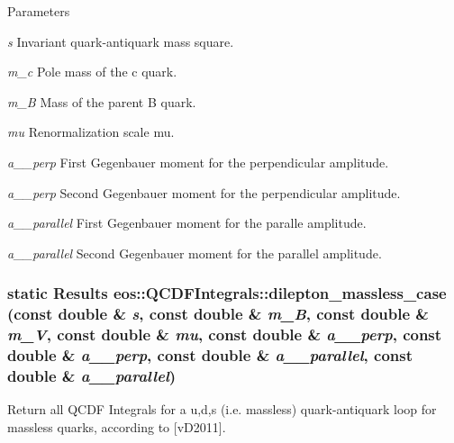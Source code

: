 \begin{DoxyParams}{Parameters}
\item[{\em s}]Invariant quark-\/antiquark mass square. \item[{\em m\_\-c}]Pole mass of the c quark. \item[{\em m\_\-B}]Mass of the parent B quark. \item[{\em mu}]Renormalization scale mu. \item[{\em a\_\-1\_\-perp}]First Gegenbauer moment for the perpendicular amplitude. \item[{\em a\_\-2\_\-perp}]Second Gegenbauer moment for the perpendicular amplitude. \item[{\em a\_\-1\_\-parallel}]First Gegenbauer moment for the paralle amplitude. \item[{\em a\_\-2\_\-parallel}]Second Gegenbauer moment for the parallel amplitude. \end{DoxyParams}
\hypertarget{classeos_1_1QCDFIntegrals_a46d8f57850d80b92498c15caac8b0229}{
\subsubsection[{dilepton\_\-massless\_\-case}]{\setlength{\rightskip}{0pt plus 5cm}static {\bf Results} eos::QCDFIntegrals::dilepton\_\-massless\_\-case (const double \& {\em s}, \/  const double \& {\em m\_\-B}, \/  const double \& {\em m\_\-V}, \/  const double \& {\em mu}, \/  const double \& {\em a\_\_\-perp}, \/  const double \& {\em a\_\_\-perp}, \/  const double \& {\em a\_\_\-parallel}, \/  const double \& {\em a\_\_\-parallel})}}
\label{classeos_1_1QCDFIntegrals_a46d8f57850d80b92498c15caac8b0229}
Return all QCDF Integrals for a u,d,s (i.e. massless) quark-\/antiquark loop for massless quarks, according to \mbox{[}vD2011\mbox{]}.



